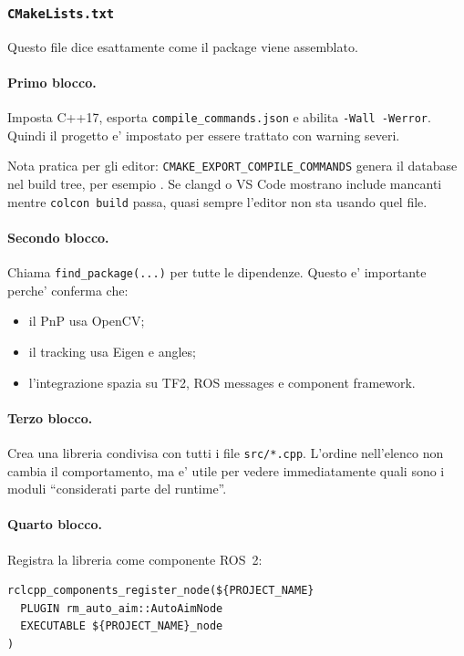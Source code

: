 \documentclass[11pt,a4paper]{article}
\newcommand{\code}[1]{\texttt{#1}}
\begin{document}
\subsubsection{\code{CMakeLists.txt}}

Questo file dice esattamente come il package viene assemblato.

\paragraph{Primo blocco.}
Imposta C++17, esporta \code{compile\_commands.json} e abilita \code{-Wall -Werror}. Quindi il progetto e' impostato per essere trattato con warning severi.

Nota pratica per gli editor: \code{CMAKE\_EXPORT\_COMPILE\_COMMANDS} genera il database nel build tree, per esempio . Se clangd o VS Code mostrano include mancanti mentre \code{colcon build} passa, quasi sempre l'editor non sta usando quel file.

\paragraph{Secondo blocco.}
Chiama \code{find\_package(...)} per tutte le dipendenze. Questo e' importante perche' conferma che:
\begin{itemize}[leftmargin=1.4em]
  \item il PnP usa OpenCV;
  \item il tracking usa Eigen e angles;
  \item l'integrazione spazia su TF2, ROS messages e component framework.
\end{itemize}

\paragraph{Terzo blocco.}
Crea una libreria condivisa con tutti i file \code{src/*.cpp}. L'ordine nell'elenco non cambia il comportamento, ma e' utile per vedere immediatamente quali sono i moduli ``considerati parte del runtime''.

\paragraph{Quarto blocco.}
Registra la libreria come componente ROS~2:
\begin{lstlisting}[style=cppstyle,caption={Dichiarazione del nodo come componente ROS 2 nel build system}]
rclcpp_components_register_node(${PROJECT_NAME}
  PLUGIN rm_auto_aim::AutoAimNode
  EXECUTABLE ${PROJECT_NAME}_node
)
\end{lstlisting}
\end{document}
